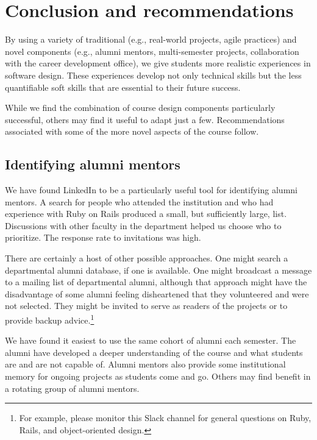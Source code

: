 \section{Conclusion and recommendations}

By using a variety of traditional (e.g., real-world projects, agile
practices) and novel components (e.g., alumni mentors, multi-semester
projects, collaboration with the career development office), we
give students more realistic experiences in software design.  These
experiences develop not only technical skills but the less quantifiable
soft skills that are essential to their future success.

While we find the combination of course design components particularly
successful, others may find it useful to adapt just a few.  Recommendations
associated with some of the more novel aspects of the course follow.

\subsection{Identifying alumni mentors}

We have found LinkedIn to be a particularly useful tool for identifying
alumni mentors.  A search for people who attended the institution and
who had experience with Ruby on Rails produced a small, but sufficiently
large, list.  Discussions with other faculty in the department helped
us choose who to prioritize.  The response rate to invitations was high.

There are certainly a host of other possible approaches.  One might search
a departmental alumni database, if one is available.  One might broadcast
a message to a mailing list of departmental alumni, although that approach
might have the disadvantage of some alumni feeling disheartened that they
volunteered and were not selected.  They might be invited to serve as
readers of the projects or to provide backup advice.\footnote{For example,
please monitor this Slack channel for general questions on Ruby, Rails,
and object-oriented design.} %

We have found it easiest to use the same cohort of alumni each semester.
The alumni have developed a deeper understanding of the course and what
students are and are not capable of.  Alumni mentors also provide some 
institutional memory for ongoing projects as students come and go. 
Others may find benefit in a rotating group of alumni mentors.

